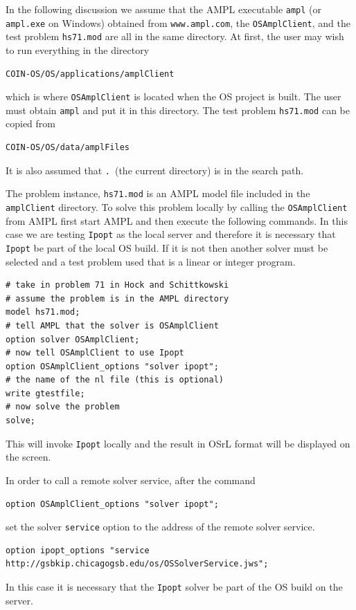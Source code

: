 \documentclass[11pt]{article}
\renewcommand{\_}{{\char"5F}}
\renewcommand{\{}{{\char"7B}}
\renewcommand{\}}{{\char"7D}}
\renewcommand{\^}{{\char"0D}}
\renewcommand{\'}{{\char"0D}}
\begin{document}
\begin{enumerate}[Step 1:]
In the following discussion we assume that the AMPL executable {\tt ampl}  (or {\tt ampl.exe} on Windows) obtained 
from {\tt www.ampl.com}, the {\tt OSAmplClient}, and the test problem {\tt hs71.mod} are all in the same directory. 
At first, the user may wish to run everything in the directory

\begin{verbatim}
COIN-OS/OS/applications/amplClient
\end{verbatim}
which is where {\tt OSAmplClient} is located when the OS project is built. The user must obtain {\tt ampl} and put 
it in this directory.  The test problem {\tt hs71.mod} can be copied from

\begin{verbatim}
COIN-OS/OS/data/amplFiles
\end{verbatim}
It is also assumed that {\tt .}~(the current directory) is in the search path.

The  problem instance, {\tt hs71.mod} is an AMPL model file included in the {\tt amplClient} directory. 
To solve this problem locally by calling the {\tt OSAmplClient} from AMPL first start AMPL and then 
execute the following commands. In this case we are testing  {\tt Ipopt} as the 
local server and therefore it is necessary that {\tt Ipopt} be part of the local OS build. If it is not 
then another solver must be selected and a test problem used that is a linear or integer program.

\begin{verbatim}
# take in problem 71 in Hock and Schittkowski
# assume the problem is in the AMPL directory
model hs71.mod;
# tell AMPL that the solver is OSAmplClient
option solver OSAmplClient;
# now tell OSAmplClient to use Ipopt
option OSAmplClient_options "solver ipopt";
# the name of the nl file (this is optional)
write gtestfile;
# now solve the problem
solve;
\end{verbatim}

This will invoke {\tt Ipopt} locally and the result in OSrL format will be displayed on the screen. 

In order to call a remote solver service, after the command
\begin{verbatim}
option OSAmplClient_options "solver ipopt";
\end{verbatim}
set the solver {\tt service} option to  the address of the remote solver service.
\begin{verbatim}
option ipopt_options "service http://gsbkip.chicagogsb.edu/os/OSSolverService.jws";
\end{verbatim}
In this case it is necessary that the {\tt Ipopt} solver be part of the OS build on the server.



\end{enumerate}
\end{document}

